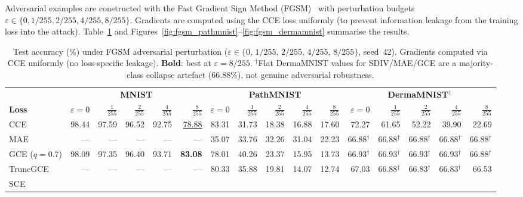 Adversarial examples are constructed with the Fast Gradient Sign Method
(FGSM)~\citep{FGSM-Attack} with perturbation budgets
$\varepsilon \in \{0, 1/255, 2/255, 4/255, 8/255\}$.
Gradients are computed using the CCE loss uniformly (to prevent information
leakage from the training loss into the attack).
Table~\ref{tab:fgsm} and Figures~\ref{fig:fgsm_pathmnist}--\ref{fig:fgsm_dermamnist}
summarise the results.

\begin{table}[t]
\centering
\caption{%
Test accuracy (\%) under FGSM adversarial perturbation
($\varepsilon \in \{0,\,1/255,\,2/255,\,4/255,\,8/255\}$, seed~42).
Gradients computed via CCE uniformly (no loss-specific leakage).
\textbf{Bold}: best at $\varepsilon{=}8/255$.
$^{\dagger}$Flat DermaMNIST values for SDIV/MAE/GCE are a majority-class
collapse artefact (66.88\%), not genuine adversarial robustness.
}
\label{tab:fgsm}
\small
\setlength{\tabcolsep}{4pt}
\begin{tabular}{@{}l rrrrr | rrrrr | rrrrr@{}}
\toprule
 & \multicolumn{5}{c|}{\textbf{MNIST}} &
   \multicolumn{5}{c|}{\textbf{PathMNIST}} &
   \multicolumn{5}{c}{\textbf{DermaMNIST}$^{\dagger}$} \\
\cmidrule(lr){2-6}\cmidrule(lr){7-11}\cmidrule(l){12-16}
\textbf{Loss}
  & $\varepsilon{=}0$ & $\tfrac{1}{255}$ & $\tfrac{2}{255}$ & $\tfrac{4}{255}$ & $\tfrac{8}{255}$
  & $\varepsilon{=}0$ & $\tfrac{1}{255}$ & $\tfrac{2}{255}$ & $\tfrac{4}{255}$ & $\tfrac{8}{255}$
  & $\varepsilon{=}0$ & $\tfrac{1}{255}$ & $\tfrac{2}{255}$ & $\tfrac{4}{255}$ & $\tfrac{8}{255}$ \\
\midrule
CCE
  & 98.44 & 97.59 & 96.52 & 92.75 & \underline{78.88}
  & 83.31 & 31.73 & 18.38 & 16.88 & 17.60
  & 72.27 & 61.65 & 52.22 & 39.90 & 22.69 \\
MAE
  & --- & --- & --- & --- & ---
  & 35.07 & 33.76 & 32.26 & 31.04 & 22.23
  & 66.88$^{\dagger}$ & 66.88$^{\dagger}$ & 66.88$^{\dagger}$ & 66.88$^{\dagger}$ & 66.88$^{\dagger}$ \\
GCE ($q{=}0.7$)
  & 98.09 & 97.35 & 96.40 & 93.71 & \textbf{83.08}
  & 78.01 & 40.26 & 23.37 & 15.95 & 13.73
  & 66.93$^{\dagger}$ & 66.93$^{\dagger}$ & 66.93$^{\dagger}$ & 66.93$^{\dagger}$ & 66.88$^{\dagger}$ \\
TruncGCE
  & --- & --- & --- & --- & ---
  & 80.33 & 35.88 & 19.81 & 14.07 & 12.74
  & 67.03 & 66.88$^{\dagger}$ & 66.83$^{\dagger}$ & 66.83$^{\dagger}$ & 66.53 \\
SCE

\end{tabular}
\end{table}
